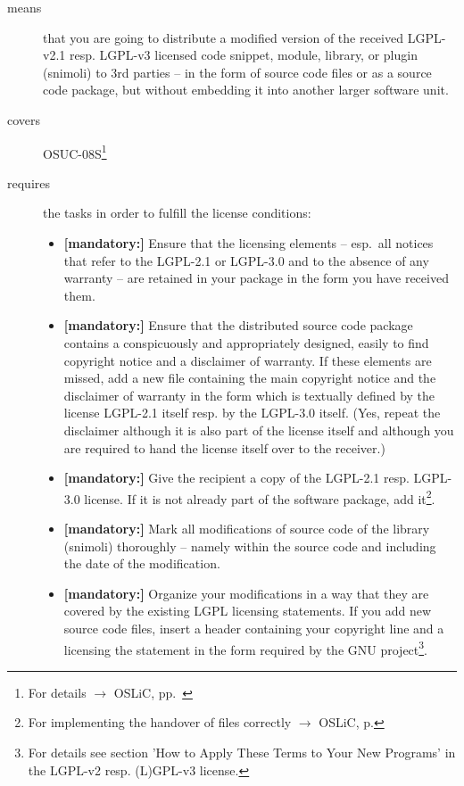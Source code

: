 \begin{description}
\item[means] that you are going to distribute a modified version of the received
LGPL-v2.1 resp. LGPL-v3 licensed code snippet, module, library, or plugin
(snimoli) to 3rd parties -- in the form of source code files or as a source code
package, but without embedding it into another larger software unit.
\item[covers] OSUC-08S\footnote{For details $\rightarrow$ OSLiC, pp.\
\pageref{OSUC-08S-DEF}}
\item[requires] the tasks in order to fulfill the license conditions:
\begin{itemize}
 
   \item \textbf{[mandatory:]} Ensure that the licensing elements -- esp.\ all
  notices that refer to the LGPL-2.1 or LGPL-3.0 and to the absence of any
  warranty -- are retained in your package in the form you have received them.

  \item \textbf{[mandatory:]} Ensure that the distributed source code package
  contains a conspicuously and appropriately designed, easily to find copyright
  notice and a disclaimer of warranty. If these elements are missed, add a new
  file containing the main copyright notice and the disclaimer of warranty in the
  form which is textually defined by the license LGPL-2.1 itself resp. by the
  LGPL-3.0 itself. (Yes, repeat the disclaimer although it is also part of the
  license itself and although you are required to hand the license itself over
  to the receiver.)
  
  \item \textbf{[mandatory:]} Give the recipient a copy of the LGPL-2.1 resp.
  LGPL-3.0 license. If it is not already part of the software package, add
  it\footnote{For implementing the handover of files correctly $\rightarrow$
  OSLiC, p. \pageref{DistributingFilesHint}}.
  
  \item \textbf{[mandatory:]} Mark all modifications of source code of the
  library (snimoli) thoroughly -- namely within the source code and including
  the date of the modification.
  
  \item \textbf{[mandatory:]} Organize your modifications in a way that they are
  covered by the existing LGPL licensing statements. If you add new source code
  files, insert a header containing your copyright line and a licensing the
  statement in the form required by the GNU project\footnote{For details see
  section 'How to Apply These Terms to Your New Programs' in the LGPL-v2 resp.
  (L)GPL-v3 license.}.
    

\end{itemize}
\end{description}
